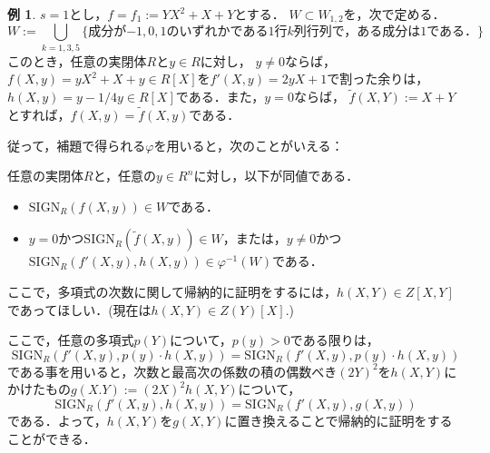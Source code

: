 \documentclass[uplatex, dvipdfmx]{jsarticle}
\newcommand{\SIGN}{\mathrm{SIGN}}
\theoremstyle{definition}
\newtheorem*{example*}{例}
\begin{document}
\begin{example*}
$s=1$とし，$f = f_1 := YX^2 + X + Y$とする．
$W \subset W_{1,2}$を，次で定める．
\begin{equation}
    W:=  \bigcup_{k=1,3,5}\{\text{成分が$-1,0,1$のいずれかである$1$行$k$列行列で，ある成分は1である．}\}
\end{equation}
このとき，任意の実閉体$R$と$y \in R$に対し，
$y \neq 0$ならば，
$f(X,y) = yX^2 + X + y \in R[X]$を$f'(X,y) = 2yX + 1$で割った余りは，
$h(X,y) = y-1/4y \in R[X]$である．また，$y = 0$ならば，
$\widetilde{f}(X,Y) := X + Y$とすれば，$f(X,y) = \widetilde{f}(X,y)$である．

従って，補題で得られる$\varphi$を用いると，次のことがいえる：

任意の実閉体$R$と，任意の$y \in R^n$に対し，以下が同値である．
\begin{itemize}
    \item $\SIGN_R(f(X,y)) \in W$である．\\
    \item $y = 0$かつ$\SIGN_R(\widetilde{f}(X,y)) \in W$，または，$y \neq 0$かつ$\SIGN_R(f'(X,y), h(X,y)) \in \varphi^{-1}(W)$である．
\end{itemize}

ここで，多項式の次数に関して帰納的に証明をするには，$h(X,Y) \in Z[X, Y]$であってほしい．(現在は$h(X,Y) \in Z(Y)[X]$.)

ここで，任意の多項式$p(Y)$について，$p(y)>0$である限りは，
\begin{equation}
    \SIGN_R(f'(X,y), p(y)\cdot h(X,y)) = \SIGN_R(f'(X,y), p(y)\cdot h(X,y))
\end{equation}
である事を用いると，次数と最高次の係数の積の偶数べき$(2Y)^2$を$h(X,Y)$にかけたもの$g(X.Y) := (2X)^2 h(X,Y)$について，
\begin{equation}
    \SIGN_R(f'(X,y), h(X,y)) = \SIGN_R(f'(X,y), g(X,y))
\end{equation}
である．よって，$h(X,Y)$を$g(X,Y)$に置き換えることで帰納的に証明をすることができる．
\end{example*}
\end{document}

